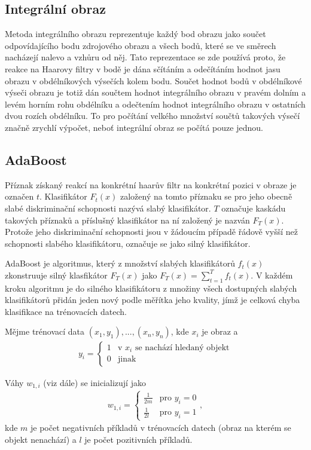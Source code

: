 \subsection{Integrální obraz}
	Metoda integrálního obrazu reprezentuje každý bod obrazu jako součet odpovídajícího bodu zdrojového obrazu a všech bodů, které se ve směrech nacházejí nalevo a vzhůru od něj. Tato reprezentace se zde používá proto, že reakce na Haarovy filtry v bodě je dána sčítáním a odečítáním hodnot jasu obrazu v obdélníkových výsečích kolem bodu. Součet hodnot bodů v obdélníkové výseči obrazu je totiž dán součtem hodnot integrálního obrazu v pravém dolním a levém horním rohu obdélníku a odečtením hodnot integrálního obrazu v ostatních dvou rozích obdélníku. To pro počítání velkého množství součtů takových výsečí značně zrychlí výpočet, neboť integrální obraz se počítá pouze jednou.
	
\subsection{AdaBoost}
\label{subsec_adaboost}

	Příznak získaný reakcí na konkrétní haarův filtr na konkrétní pozici v obraze je označen $t$. Klasifikátor $F_t(x)$ založený na tomto příznaku se pro jeho obecně slabé diskriminační schopnosti nazývá slabý klasifikátor. $T$ označuje kaskádu takových příznaků a příslušný klasifikátor na ní založený je nazván $F_T(x)$. Protože jeho diskriminační schopnosti jsou v žádoucím případě řádově vyšší než schopnosti slabého klasifikátoru, označuje se jako silný klasifikátor.
	
	AdaBoost je algoritmus, který z množství slabých klasifikátorů $f_t(x)$ zkonstruuje silný klasfikátor $F_T(x)$ jako $F_T(x) = \sum_{t=1}^{T} f_t(x)$. V každém kroku algoritmu je do silného klasifikátoru z množiny všech dostupných slabých klasifikátorů přidán jeden nový podle měřítka jeho kvality, jímž je celková chyba klasifikace na trénovacích datech. 
	
	Mějme trénovací data $(x_1, y_1), ... ,(x_n, y_n)$, kde $x_i$ je obraz a 
	\begin{align}
	y_i = \begin{cases}
	1 & \text{v } x_i \text{ se nachází hledaný objekt} \\
	0 & \text{jinak}
	\end{cases}
	\end{align}  
	
	Váhy $w_{1,i}$ (viz dále)  se inicializují jako 
	\begin{align}
	w_{1,i} = \begin{cases}
	\frac{1}{2m} & \text{pro } y_i = 0\\
	\frac{1}{2l} & \text{pro } y_i = 1
	\end{cases},
	\end{align}
	kde $m$ je počet negativních příkladů v trénovacích datech (obraz na kterém se objekt nenachází) a $l$ je počet pozitivních příkladů.
	
